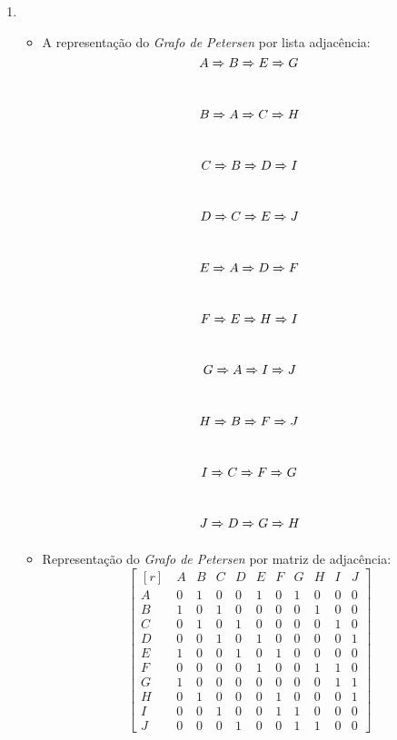 \documentclass[11pt,reqno]{amsart}
\begin{document}
\begin{enumerate}
\item 
\begin{itemize}
	\item A representação do \textit{Grafo de Petersen} por lista adjacência:\\\[A \xRightarrow[ ]{ } B \xRightarrow[ ]{ } E \xRightarrow[ ]{ } G \]\\\[B \xRightarrow[ ]{ } A \xRightarrow[ ]{ } C \xRightarrow[ ]{ } H \]\\\[C \xRightarrow[ ]{ } B \xRightarrow[ ]{ } D \xRightarrow[ ]{ } I \]\\\[D \xRightarrow[ ]{ } C \xRightarrow[ ]{ } E \xRightarrow[ ]{ } J \]\\\[E \xRightarrow[ ]{ } A \xRightarrow[ ]{ } D \xRightarrow[ ]{ } F \]\\\[F \xRightarrow[ ]{ } E \xRightarrow[ ]{ } H \xRightarrow[ ]{ } I \]\\ \[G \xRightarrow[ ]{ } A \xRightarrow[ ]{ } I \xRightarrow[ ]{ } J \]\\\[H \xRightarrow[ ]{ } B \xRightarrow[ ]{ } F \xRightarrow[ ]{ } J \]\\\[I \xRightarrow[ ]{ } C \xRightarrow[ ]{ } F \xRightarrow[ ]{ } G \]\\\[J \xRightarrow[ ]{ } D \xRightarrow[ ]{ } G \xRightarrow[ ]{ } H \]
	\item Representação do \textit{Grafo de Petersen} por matriz de adjacência:\\ \[ \begin{bmatrix*}[r] \ & A & B & C & D & E & F & G & H & I & J\\ A & 0 & 1 & 0 & 0 & 1 & 0 & 1 & 0 & 0 & 0 \\ B & 1 & 0 & 1 & 0 & 0 & 0 & 0 & 1 & 0 & 0\\ C & 0 & 1 & 0 & 1 & 0 & 0 & 0 & 0 & 1 & 0\\ D & 0 & 0 & 1 & 0 & 1 & 0 & 0 & 0 & 0 & 1\\ E & 1 & 0 & 0 & 1 & 0 & 1 & 0 & 0 & 0 & 0\\ F & 0 & 0 & 0 & 0 & 1 & 0 & 0 & 1 & 1 & 0\\ G & 1 & 0 & 0 & 0 & 0 & 0 & 0 & 0 & 1 & 1\\ H & 0 & 1 & 0 & 0 & 0 & 1 & 0 & 0 & 0 & 1\\ I & 0 & 0 & 1 & 0 & 0 & 1 & 1 & 0 & 0 & 0\\ J & 0 & 0 & 0 & 1 & 0 & 0 & 1 & 1 & 0 & 0 \end{bmatrix*} \]
\end{itemize}
\vspace{0.3cm}


\end{enumerate}
\end{document}
